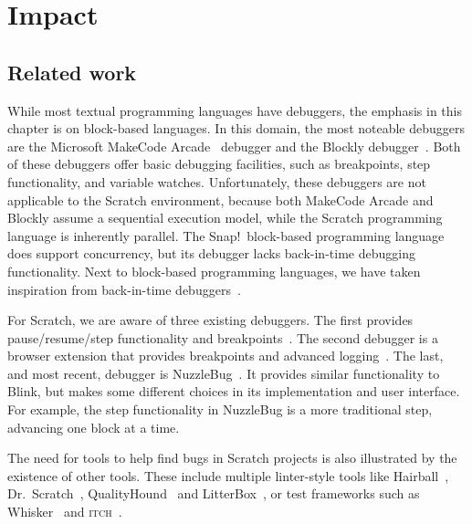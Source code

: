 \documentclass[../main]{subfiles}
\begin{document}
\section{Impact}\label{sec:blink-impact}

\subsection{Related work}\label{subsec:related-work}
While most textual programming languages have debuggers, the emphasis in this chapter is on block-based languages.
In this domain, the most noteable debuggers are the Microsoft MakeCode Arcade~\autocite{ballMicrosoftMakeCodeEmbedded2019a} debugger and the Blockly debugger~\autocite{savidisCompleteBlockLevelVisual2020a}.
Both of these debuggers offer basic debugging facilities, such as breakpoints, step functionality, and variable watches.
Unfortunately, these debuggers are not applicable to the Scratch environment, because both MakeCode Arcade and Blockly assume a sequential execution model, while the Scratch programming language is inherently parallel.
The Snap!\ block-based programming language~\autocite{garciaSnapBuildYour2012a} does support concurrency, but its debugger lacks back-in-time debugging functionality.
Next to block-based programming languages, we have taken inspiration from back-in-time debuggers~\autocite{barrTardisAffordableTimetravel2014a,barrTimetravelDebuggingJavaScript2016a}.

For Scratch, we are aware of three existing debuggers.
The first provides pause/resume/step functionality and breakpoints~\autocite{wangDevelopingResourcesDebugging2021}.
The second debugger is a browser extension that provides breakpoints and advanced logging~\autocite{ScratchAddons2023}.
The last, and most recent, debugger is NuzzleBug~\autocite{deinerNuzzleBugDebuggingBlockbased2023}.
It provides similar functionality to Blink, but makes some different choices in its implementation and user interface.
For example, the step functionality in NuzzleBug is a more traditional step, advancing one block at a time.

The need for tools to help find bugs in Scratch projects is also illustrated by the existence of other tools.
These include multiple linter-style tools like Hairball~\autocite{boeHairballLintinspiredStatic2013}, Dr.\ Scratch~\autocite{moreno-leonDrScratchWeb2015}, QualityHound~\autocite{techapalokulQualityHoundOnline2017} and LitterBox~\autocite{fraserLitterBoxLinterScratch2021}, or test frameworks such as Whisker~\autocite{stahlbauerTestingScratchPrograms2019} and \textsc{itch}~\autocite{johnsonITCHIndividualTesting2016}.
\end{document}
